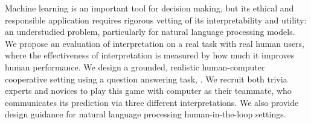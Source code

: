 Machine learning is an important tool for decision making, but its
ethical and responsible application requires rigorous vetting of its
interpretability and utility: an understudied problem, particularly
for natural language processing models.  
We propose an evaluation of interpretation on a
real task with real human users, where the effectiveness of
interpretation is measured by how much it improves human performance.
We design a grounded, realistic human-computer cooperative setting
using a question answering task, \qb{}.
We recruit both trivia experts and novices to play this game with
computer as their teammate, who communicates its prediction via three
different interpretations.
We also provide design guidance for natural language processing
human-in-the-loop settings.
